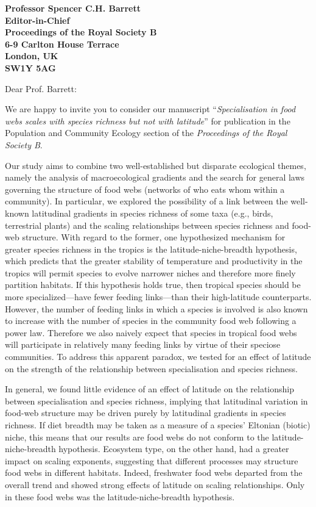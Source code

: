 \documentclass[12pt]{letter}
\newcommand{\mytitle}{\emph{Specialisation in food webs scales with species richness but not with latitude}}
\newcommand{\myjournal}{\emph{Proceedings of the Royal Society B}}
\begin{document}
\begin{letter}{\bf Professor Spencer C.H. Barrett\\
               Editor-in-Chief\\
               Proceedings of the Royal Society B\\
               6-9 Carlton House Terrace\\
               London, UK\\
               SW1Y 5AG\\
                }

\opening{Dear Prof. Barrett:}

We are happy to invite you to consider our manuscript 
``\mytitle'' for publication in the Population and Community Ecology section of the \myjournal. 

Our study aims to combine two well-established but disparate ecological
themes, namely the analysis of macroecological gradients and the search for
general laws governing the structure of food webs (networks of who eats whom
within a community). In particular, we explored the possibility of a link
between the well-known latitudinal gradients in species richness of some taxa
(e.g., birds, terrestrial plants) and the scaling relationships between
species richness and food-web structure. With regard to the former, one
hypothesized mechanism for greater species richness in the tropics is the
latitude-niche-breadth hypothesis, which predicts that the greater stability
of temperature and productivity in the tropics will permit species to evolve
narrower niches and therefore more finely partition habitats. If this
hypothesis holds true, then tropical species should be more specialized---have
fewer feeding links---than their high-latitude counterparts. However, the
number of feeding links in which a species is involved is also known to
increase with the number of species in the community food web following a
power law. Therefore we also naively expect that species in tropical food webs
will participate in relatively many feeding links by virtue of their speciose
communities. To address this apparent paradox, we tested for an effect of
latitude on the strength of the relationship between specialisation and species 
richness.


In general, we found little evidence of an effect of latitude on the
relationship between specialisation and species richness, implying that
latitudinal variation in food-web structure may be driven purely by
latitudinal gradients in species richness. If diet breadth may be taken as a
measure of a species' Eltonian (biotic) niche, this means that our results are
food webs do not conform to the latitude-niche-breadth hypothesis. Ecosystem
type, on the other hand, had a greater impact on scaling exponents, suggesting
that different processes may structure food webs in different habitats.
Indeed, freshwater food webs departed from the overall trend and showed strong
effects of latitude on scaling relationships. Only in these food webs was the
latitude-niche-breadth hypothesis.



\end{letter}
\end{document}
